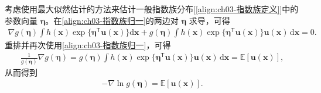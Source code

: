 \documentclass[../../main.tex]{subfiles}
\begin{document}
考虑使用最大似然估计的方法来估计一般指数族分布[\eqref{align:ch03-指数族定义}]中的参数向量 $\boldsymbol{\eta}$。在\eqref{align:ch03-指数族归一}的两边对 $\boldsymbol{\eta}$ 求导，可得
\begin{align}
\nabla g(\boldsymbol{\eta})\int h(\boldsymbol{x})\exp\bigl\{\boldsymbol{\eta}^{\mathsf{T}}\boldsymbol{u}(\boldsymbol{x})\bigr\}\mathrm{d}\boldsymbol{x}+g(\boldsymbol{\eta})\int h(\boldsymbol{x})\exp\bigl\{\boldsymbol{\eta}^{\mathsf{T}}\boldsymbol{u}(\boldsymbol{x})\bigr\}\boldsymbol{u}(\boldsymbol{x})\,\mathrm{d}\boldsymbol{x}=0.
\label{align:ch03-指数族求导}
\end{align}
重排并再次使用\eqref{align:ch03-指数族归一}，可得
\begin{align}
\frac{1}{g(\boldsymbol{\eta})}\nabla g(\boldsymbol{\eta})=g(\boldsymbol{\eta})\int h(\boldsymbol{x})\exp\bigl\{\boldsymbol{\eta}^{\mathsf{T}}\boldsymbol{u}(\boldsymbol{x})\bigr\}\boldsymbol{u}(\boldsymbol{x})\,\mathrm{d}\boldsymbol{x}=\mathbb{E}[\boldsymbol{u}(\boldsymbol{x})],
\label{align:ch03-指数族矩推导}
\end{align}
从而得到
\begin{align}
-\nabla\ln g(\boldsymbol{\eta})=\mathbb{E}[\boldsymbol{u}(\boldsymbol{x})].
\label{align:ch03-指数族矩}
\end{align}
\end{document}
